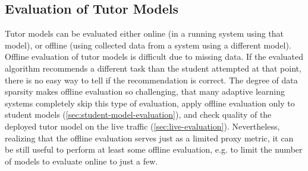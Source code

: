 

\subsection{Evaluation of Tutor Models}
\label{tutors.evaluation}


Tutor models can be evaluated either online (in a running system using that model),
or offline (using collected data from a system using a different model).
Offline evaluation of tutor models is difficult due to missing data.
If the evaluated algorithm recommends a different task than the student attempted
at that point, there is no easy way to tell if the recommendation is correct. %
The degree of data sparsity makes offline evaluation so challenging,
that many adaptive learning systems completely skip this type of evaluation,
apply offline evaluation only to student models (\cref{sec:student-model-evaluation}),
and check quality of the deployed tutor model on the live traffic
(\cref{sec:live-evaluation}).
Nevertheless, realizing that the offline evaluation serves just as
a limited proxy metric,
it can be still useful to perform at least some offline evaluation,
e.g. to limit the number of models to evaluate online to just a few.

